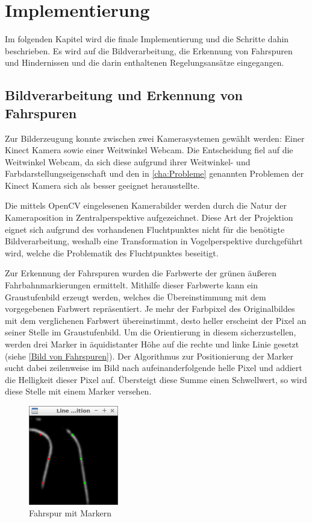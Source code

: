 \section{Implementierung}
\label{cha:Implementierung}
Im folgenden Kapitel wird die finale Implementierung und die Schritte dahin beschrieben. Es wird auf die Bildverarbeitung, die Erkennung von Fahrspuren und Hindernissen und die darin enthaltenen Regelungsansätze eingegangen.
\subsection{Bildverarbeitung und Erkennung von Fahrspuren}
\label{sec:spurerkennung}
Zur Bilderzeugung konnte zwischen zwei Kamerasystemen gewählt werden: Einer Kinect Kamera sowie einer Weitwinkel Webcam. Die Entscheidung fiel auf die Weitwinkel Webcam, da sich diese aufgrund ihrer Weitwinkel- und Farbdarstellungseigenschaft und den in \autoref{cha:Probleme} genannten Problemen der Kinect Kamera sich als besser geeignet herausstellte. 

Die mittels OpenCV eingelesenen Kamerabilder werden durch die Natur der Kameraposition in Zentralperspektive aufgezeichnet. Diese Art der Projektion eignet sich aufgrund des vorhandenen Fluchtpunktes nicht für die benötigte Bildverarbeitung, weshalb eine Transformation in Vogelperspektive durchgeführt wird, welche die Problematik des Fluchtpunktes beseitigt.

Zur Erkennung der Fahrspuren wurden die Farbwerte der grünen äußeren Fahrbahnmarkierungen ermittelt. Mithilfe dieser Farbwerte kann ein Graustufenbild erzeugt werden, welches die Übereinstimmung mit dem vorgegebenen Farbwert repräsentiert. Je mehr der Farbpixel des Originalbildes mit dem verglichenen Farbwert übereinstimmt, desto heller erscheint der Pixel an seiner Stelle im Graustufenbild. Um die Orientierung in diesem sicherzustellen, werden drei Marker in äquidistanter Höhe auf die rechte und linke Linie gesetzt (siehe \autoref{Bild von Fahrspuren}). Der Algorithmus zur Positionierung der Marker sucht dabei zeilenweise im Bild nach aufeinanderfolgende helle Pixel und addiert die Helligkeit dieser Pixel auf. Übersteigt diese Summe einen Schwellwert, so wird diese Stelle mit einem Marker versehen.

\begin{figure}[ht]
	\centering
	\includegraphics[width=0.35\textwidth]{images/isnt_straight_original.png}
	\caption{Fahrspur mit Markern}
\end{figure}
\label{Bild von Fahrspuren}

